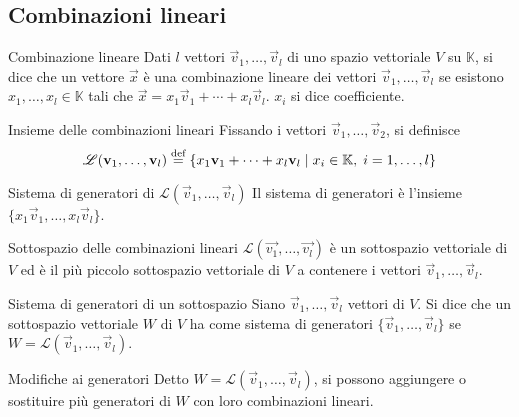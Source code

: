 \subsection{Combinazioni lineari}%
\label{sub:combinazioni_lineari}

\begin{Def}{Combinazione lineare}
  Dati $l$ vettori $\vec{v}_1,\ldots,\vec{v}_l$ di uno spazio vettoriale $V$ su
  $\mathbb{K}$, si dice che un vettore $\vec{x}$ è una combinazione lineare dei vettori
  $\vec{v}_1,\ldots,\vec{v}_l$ se esistono $x_1,\ldots,x_l\in\mathbb{K}$ tali che
  $\vec{x}=x_1\vec{v}_1+\cdots+x_l\vec{v}_l$. $x_i$ si dice coefficiente.
\end{Def}

\begin{Def}{Insieme delle combinazioni lineari}
  Fissando i vettori $\vec{v}_1,\ldots,\vec{v}_2$, si definisce
  \begin{equation*}
    \mathscr{L}(\vec{v}_1,\ldots,\vec{v}_l)\bydef \left\{
    x_1\vec{v}_1+\cdots+x_l\vec{v}_l \Setsuchthat x_i\in\mathbb{K},\;i=1,\ldots,l \right\}
  \end{equation*}
\end{Def}

\begin{Def}{Sistema di generatori di $\mathscr{L}(\vec{v}_1,\ldots,\vec{v}_l)$}
  Il sistema di generatori è l'insieme $\{x_1\vec{v}_1,\ldots,x_l\vec{v}_l\}$.
\end{Def}

\begin{Thm}{Sottospazio delle combinazioni lineari}
  $\mathscr{L}(\vec{v_1},\ldots,\vec{v_l})$ è un sottospazio vettoriale di $V$ ed è il
  più piccolo sottospazio vettoriale di $V$ a contenere i vettori
  $\vec{v}_1,\ldots,\vec{v}_l$.
\end{Thm}

\begin{Def}{Sistema di generatori di un sottospazio}
  Siano $\vec{v}_1,\ldots,\vec{v}_l$ vettori di $V$. Si dice che un sottospazio
  vettoriale $W$ di $V$ ha come sistema di generatori $\{\vec{v}_1,\ldots,\vec{v}_l\}$
  se $W=\mathscr{L}(\vec{v}_1,\ldots,\vec{v}_l)$.
\end{Def}

\begin{Thm}{Modifiche ai generatori}
  Detto $W=\mathscr{L}(\vec{v}_1,\ldots,\vec{v}_l)$, si possono aggiungere o sostituire
  più generatori di $W$ con loro combinazioni lineari.
\end{Thm}

